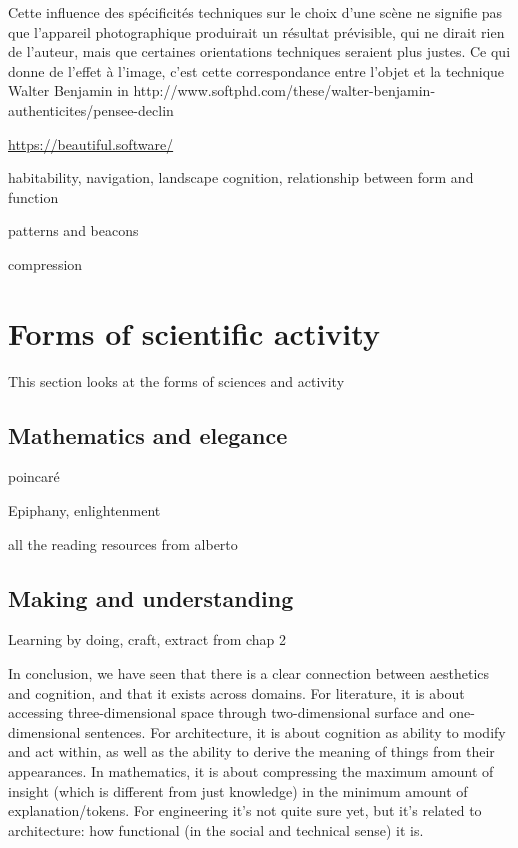 Cette influence des spécificités techniques sur le choix d'une scène ne signifie pas que l'appareil photographique produirait un résultat prévisible, qui ne dirait rien de l'auteur, mais que certaines orientations techniques seraient plus justes. Ce qui donne de l'effet à l'image, c'est cette correspondance entre l'objet et la technique Walter Benjamin in http://www.softphd.com/these/walter-benjamin-authenticites/pensee-declin

\url{https://beautiful.software/}

habitability, navigation, landscape cognition, relationship between form and function

patterns and beacons

compression

\section{Forms of scientific activity}
\label{sec:aesthetic-scientific}

This section looks at the forms of sciences and activity


\subsection{Mathematics and elegance}
\label{subsec:aesthetic-mathematics}

poincaré

Epiphany, enlightenment

all the reading resources from alberto


\subsection{Making and understanding}
\label{subsec:aesthetic-engineering}


Learning by doing, craft, extract from chap 2

\spacer

In conclusion, we have seen that there is a clear connection between aesthetics and cognition, and that it exists across domains. For literature, it is about accessing three-dimensional space through two-dimensional surface and one-dimensional sentences. For architecture, it is about cognition as ability to modify and act within, as well as the ability to derive the meaning of things from their appearances. In mathematics, it is about compressing the maximum amount of insight (which is different from just knowledge) in the minimum amount of explanation/tokens. For engineering it's not quite sure yet, but it's related to architecture: how functional (in the social and technical sense) it is.